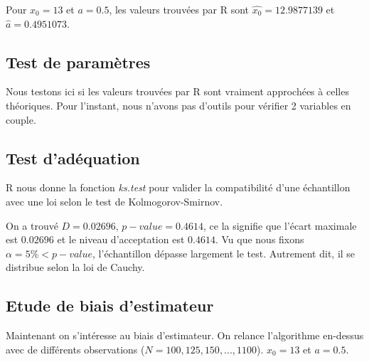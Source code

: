 \documentclass[12pt,a4paper,titlepage]{article}
\numberwithin{equation}{section}
\begin{document}
Pour $x_0=13$ et $a=0.5$, les valeurs trouvées par R sont $\hat{x_0} = 12.9877139$ et $\hat{a} = 0.4951073$.

\subsection{Test de paramètres}

Nous testons ici si les valeurs trouvées par R sont vraiment approchées à celles théoriques. Pour l'instant, nous n'avons pas d'outils pour vérifier 2 variables en couple.

\subsection{Test d'adéquation}

R nous donne la fonction \emph{ks.test} pour valider la compatibilité d'une échantillon avec une loi selon le test de Kolmogorov-Smirnov.



On a trouvé $D = 0.02696$, $p-value = 0.4614$, ce la signifie que l'écart maximale est $0.02696$ et le niveau d'acceptation est $0.4614$. Vu que nous fixons $\alpha = 5\% < p-value$, l'échantillon dépasse largement le test. Autrement dit, il se distribue selon la loi de Cauchy.

\subsection{Etude de biais d'estimateur}

Maintenant on s'intéresse au biais d'estimateur. On relance l'algorithme en-dessus avec de différents observations ($N = 100, 125, 150,..., 1100$). $x_0 = 13$ et $a = 0.5$.


\end{document}
